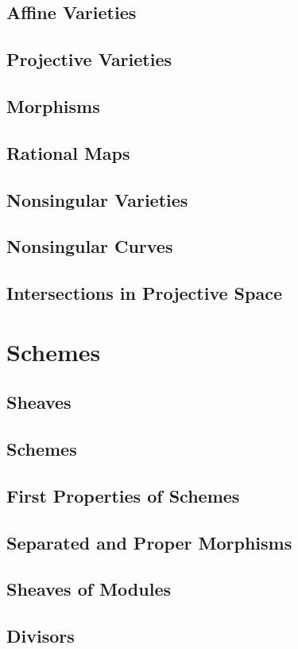\subsection{Affine Varieties}
\subsection{Projective Varieties}
\subsection{Morphisms}
\subsection{Rational Maps}
\subsection{Nonsingular Varieties}
\subsection{Nonsingular Curves}
\subsection{Intersections in Projective Space}

\section{Schemes}
\subsection{Sheaves}
\subsection{Schemes}
\subsection{First Properties of Schemes}
\subsection{Separated and Proper Morphisms}
\subsection{Sheaves of Modules}
\subsection{Divisors}
